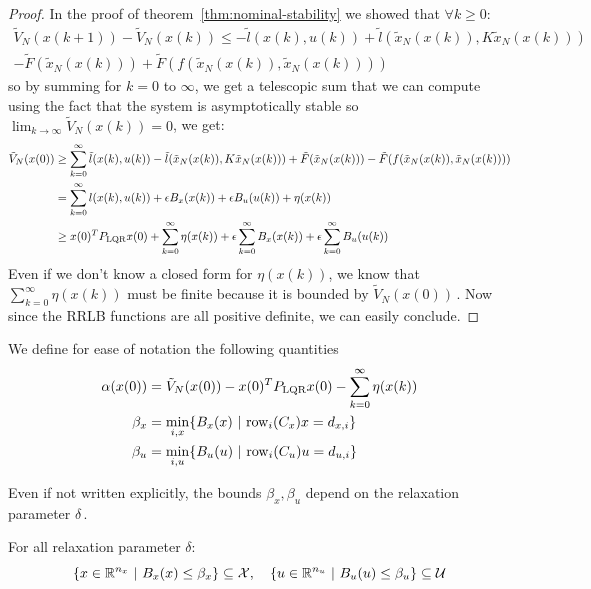 \documentclass[12pt]{article}
\begin{document}
\begin{proof}
	In the proof of theorem~\ref{thm:nominal-stability} we showed that $\forall k\geq 0$:
	\begin{multline*}
		\tilde{V}_N(x(k+1))-\tilde{V}_N(x(k))\leq-\tilde{l}(x(k),u(k))+\tilde{l}(\tilde{x}_N(x(k)), K\tilde{x}_N(x(k)))\\
		-\tilde{F}(\tilde{x}_N(x(k)))+\tilde{F}(f(\tilde{x}_N(x(k)),\tilde{x}_N(x(k))))
	\end{multline*}
	so by summing for $k=0$ to $\infty$, we get a telescopic sum that we can compute using the fact that the system is asymptotically stable so $\lim_{k\to\infty}\tilde{V}_N(x(k))=0$, we get:
	\begin{align*}
		\tilde{V}_N(x(0))&\geq\sum_{k=0}^\infty\tilde{l}(x(k),u(k))-\tilde{l}(\tilde{x}_N(x(k)), K\tilde{x}_N(x(k)))+\tilde{F}(\tilde{x}_N(x(k)))-\tilde{F}(f(\tilde{x}_N(x(k)),\tilde{x}_N(x(k))))\\
		&=\sum_{k=0}^\infty l(x(k), u(k))+\epsilon B_x(x(k))+\epsilon B_u(u(k))+\eta(x(k))\\
		&\geq x(0)^TP_{\rm{LQR}}x(0)+\sum_{k=0}^\infty\eta(x(k))+\epsilon\sum_{k=0}^\infty B_x(x(k))+\epsilon\sum_{k=0}^\infty B_u(u(k))\\
	\end{align*}
	Even if we don't know a closed form for $\eta(x(k))$, we know that $\sum_{k=0}^\infty\eta(x(k))$ must be finite because it is bounded by $\tilde{V}_N(x(0))$\,.
	Now since the RRLB functions are all positive definite, we can easily conclude.
\end{proof}

We define for ease of notation the following quantities
\begin{align*}
	\alpha(x(0))&=\tilde{V}_N(x(0))-x(0)^TP_{\rm{LQR}}x(0)-\sum_{k=0}^\infty\eta(x(k))\\
	\beta_x&=\underset{i,x}{\min}\{B_x(x)~|~\rm{row}_i(C_x)x=d_{x,i}\}\\
	\beta_u&=\underset{i,u}{\min}\{B_u(u)~|~\rm{row}_i(C_u)u=d_{u,i}\}
\end{align*}

Even if not written explicitly, the bounds $\beta_x,\beta_u$ depend on the relaxation parameter $\delta$\,.

\begin{lemma}
	\label{thm:constraint-set-def-with-RRLB}
	For all relaxation parameter $\delta$:
	$$\left\{x\in\R^{n_x}~|~B_x(x)\leq\beta_x\right\}\subseteq\cal{X},\quad\left\{u\in\R^{n_u}~|~B_u(u)\leq\beta_u\right\}\subseteq\cal{U}$$
\end{lemma}
\end{document}
